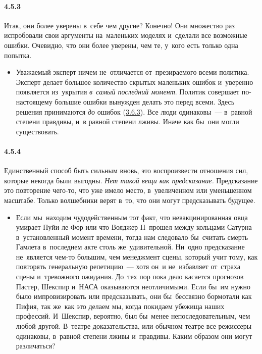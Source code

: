 \paragraph{4.5.3}\hypertarget{par:4.5.3}{} Итак, они более уверены в~себе чем другие? Конечно! Они множество раз испробовали свои аргументы на~маленьких моделях и~сделали все возможные ошибки. Очевидно, что они более уверены, чем те, у~кого есть только одна попытка.
	\begin{itemize}
	\item 
	Уважаемый эксперт ничем не~отличается от~презираемого всеми политика. Эксперт делает большое количество скрытых маленьких ошибок и~уверенно появляется из~укрытия {\itshape в~самый последний момент}. Политик совершает по-настоящему большие ошибки вынужден делать это перед всеми. Здесь решения принимаются {\itshape до} ошибок (\hyperlink{par:3.6.3}{3.6.3}). Все люди одинаковы~--- в~равной степени правдивы, и~в равной степени лживы. Иначе как бы~они могли существовать.
	\end{itemize}	 

\paragraph{4.5.4}\hypertarget{par:4.5.4}{} Единственный способ быть сильным вновь, это воспроизвести отношения сил, которые некогда были выгодны. {\itshape Нет такой вещи как предсказание.} Предсказание это повторение чего-то, что уже имело место, в~увеличенном или уменьшенном масштабе. Только волшебники верят в~то, что они могут предсказывать будущее. 
	\begin{itemize}
	\item 
	Если мы~находим чудодейственным тот факт, что невакцинированная овца умирает Пуйи-ле-Фор или что Вояджер II~прошел между кольцами Сатурна в~установленный момент времени, тогда нам следовало бы~считать смерть Гамлета в~последнем акте столь же~удивительной. Ни~одно предсказание не~является чем-то большим, чем менеджмент сцены, который учит тому, как повторять генеральную репетицию~--- хотя он~и не~избавляет от~страха сцены и~тревожного ожидания. До~тех пор пока дело касается прогнозов Пастер, Шекспир и~НАСА оказываются неотличимыми. Если бы~им нужно было импровизировать или предсказывать, они бы~бессвязно бормотали как Пифия, так же~как это делаем мы, когда покидаем убежища наших профессий. И~Шекспир, вероятно, был бы~менее непоследовательным, чем любой другой. В~театре доказательства, или обычном театре все режиссеры одинаковы, в~равной степени лживы и~правдивы. Каким образом они могут различаться?
	\end{itemize}	

